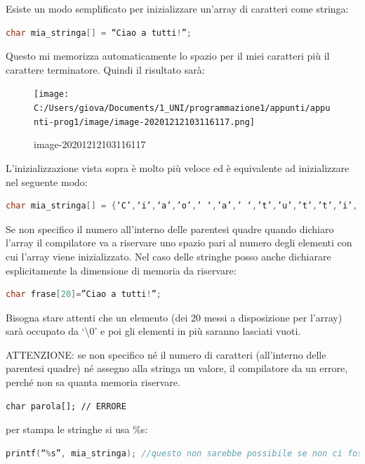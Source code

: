 \documentclass[
  paper=a4,
  oneside  ,captions=tableheading
]{scrbook}
\begin{document}
Esiste un modo semplificato per inizializzare un'array di caratteri come
stringa:

\begin{lstlisting}[language={C++}]
char mia_stringa[] = “Ciao a tutti!”;
\end{lstlisting}

Questo mi memorizza automaticamente lo spazio per il miei caratteri più
il carattere terminatore. Quindi il risultato sarà:

\begin{figure}
\centering
\texttt{[image: C:/Users/giova/Documents/1\_UNI/programmazione1/appunti/appunti-prog1/image/image-20201212103116117.png]}
\caption{image-20201212103116117}
\end{figure}

L'inizializzazione vista sopra è molto più veloce ed è equivalente ad
inizializzare nel seguente modo:

\begin{lstlisting}[language={C++}]
char mia_stringa[] = {‘C’,‘i’,‘a’,’o’,’ ‘,’a’,’ ‘,’t’,’u’,’t’,’t’,’i’,’!’,’\\0’};
\end{lstlisting}

Se non specifico il numero all'interno delle parentesi quadre quando
dichiaro l'array il compilatore va a riservare uno spazio pari al numero
degli elementi con cui l'array viene inizializzato. Nel caso delle
stringhe posso anche dichiarare esplicitamente la dimensione di memoria
da riservare:

\begin{lstlisting}[language={C++}]
char frase[20]=”Ciao a tutti!”;
\end{lstlisting}

Bisogna stare attenti che un elemento (dei 20 messi a disposizione per
l'array) sarà occupato da `\textbackslash0' e poi gli elementi in più
saranno lasciati vuoti.

ATTENZIONE: se non specifico né il numero di caratteri (all'interno
delle parentesi quadre) né assegno alla stringa un valore, il
compilatore da un errore, perché non sa quanta memoria riservare.

\begin{lstlisting}
char parola[]; // ERRORE
\end{lstlisting}

per stampa le stringhe si usa \%s:

\begin{lstlisting}[language={C++}]
printf(“%s”, mia_stringa); //questo non sarebbe possibile se non ci fosse il carattere terminatore perché non saprei dove fermarmi 
\end{lstlisting}
\end{document}
